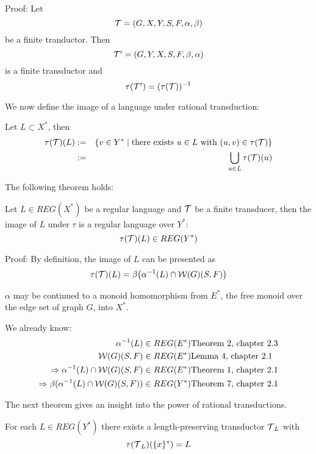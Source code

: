 Proof: Let \[ \mbox{$\mathcal{T}$} = (G, X, Y, S, F, \alpha, \beta) \] be a finite tranductor.
Then \[ \mbox{$\mathcal{T'}$} = (G, Y, X, S, F, \beta, \alpha) \] is a finite transductor and
\[ \tau(\mbox{$\mathcal{T'}$}) = (\tau(\mbox{$\mathcal{T}$}))^{-1} \]

We now define the image of a language under rational transduction:

\begin{definition}
Let $L \subset X^*$, then
\begin{eqnarray*}
\tau(\mbox{$\mathcal{T}$})(L) & := & \{ v \in Y^* \mid \mbox{there exists } u \in L \mbox{
with } (u, v) \in \tau(\mbox{$\mathcal{T}$}) \} \\
& := & \bigcup_{u \in L} \tau(\mbox{$\mathcal{T}$})(u)
\end{eqnarray*}
\end{definition}

The following theorem holds:

\begin{theorem}
Let $L \in REG(X^*)$ be a regular language and $\mbox{$\mathcal{T}$}$ be a finite transducer,
then the image of $L$ under $\tau$ is a regular language over $Y^*$:
\[ \tau(\mbox{$\mathcal{T}$})(L) \in REG(Y^*) \]
\end{theorem}

Proof: By definition, the image of $L$ can be presented as
\[ \tau(\mbox{$\mathcal{T}$})(L) = \beta\big( \alpha^{-1}(L) \cap \mbox{$\mathcal{W}(G)$}(S, F) \big) \]

$\alpha$ may be continued to a monoid homomorphism from $E^*$, the free monoid
over the edge set of graph $G$, into $X^*$.

We already know:
\begin{eqnarray*}
\alpha^{-1}(L) \in REG(E^*)    & \mbox{Theorem 2, chapter 2.3} \\
\mbox{$\mathcal{W}(G)$}(S, F) \in REG(E^*) & \mbox{Lemma 4, chapter 2.1} \\
\Rightarrow \alpha^{-1}(L) \cap \mbox{$\mathcal{W}(G)$}(S, F) \in
REG(E^*) & \mbox{Theorem 1, chapter 2.1} \\
\Rightarrow \beta(\alpha^{-1}(L) \cap \mbox{$\mathcal{W}(G)$}(S, F)) \in
REG(Y^*) & \mbox{Theorem 7, chapter 2.1}
\end{eqnarray*}

The next theorem gives an insight into the power of rational transductions.

\begin{theorem}
For each $L \in REG(Y^*)$ there exists a length-preserving transductor
$\mbox{$\mathcal{T}$}_L$ with \[ \tau(\mbox{$\mathcal{T}$}_L)(\{x\}^*) = L \]
\end{theorem}

